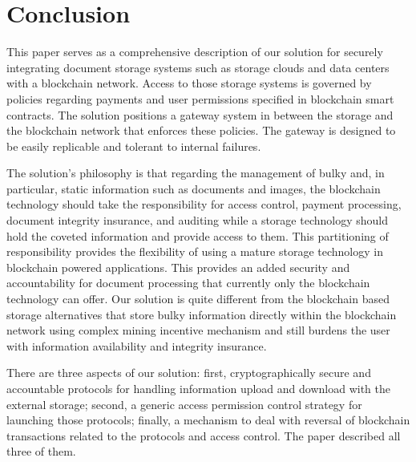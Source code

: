 
\section{Conclusion}
\label{s-con}
This paper serves as a comprehensive description of our solution for securely integrating document storage systems such as storage clouds and data centers with a blockchain network. Access to those storage systems is governed by policies regarding payments and user permissions specified in blockchain smart contracts. The solution positions a gateway system in between the storage and the blockchain network that enforces these policies. The gateway is designed to be easily replicable and tolerant to internal failures.

The solution's philosophy is that regarding the management of bulky and, in particular, static information such as documents and images, the blockchain technology should take the responsibility for access control, payment processing, document integrity insurance, and auditing while a storage technology should hold the coveted information and provide access to them. This partitioning of responsibility provides the flexibility of using a mature storage technology in blockchain powered applications. This provides an added security and accountability for document processing that currently only the blockchain technology can offer. Our solution is quite different from the blockchain based storage alternatives that store bulky information directly within the blockchain network using complex mining incentive mechanism and still burdens the user with information availability and integrity insurance.             

There are three aspects of our solution: first, cryptographically secure and accountable protocols for handling information upload and download with the external storage; second, a generic access permission control strategy for launching those protocols; finally, a mechanism to deal with reversal of blockchain transactions related to the protocols and access control. The paper described all three of them.
